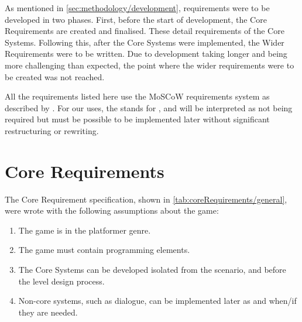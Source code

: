 
As mentioned in \autoref{sec:methodology/development}, requirements were to be developed in two phases. First, before the start of development, the Core Requirements are created and finalised. These detail requirements of the Core Systems. Following this, after the Core Systems were implemented, the Wider Requirements were to be written. Due to development taking longer and being more challenging than expected, the point where the wider requirements were to be created was not reached.

All the requirements listed here use the MoSCoW requirements system as described by \citet{useCaseModelling-MoSCoW}. For our uses, the  stands for , and will be interpreted as not being required but must be possible to be implemented later without significant restructuring or rewriting.

\section{Core Requirements}\label{sec:requirements/core}

The Core Requirement specification, shown in \autoref{tab:coreRequirements/general}, were wrote with the following assumptions about the game:

\begin{enumerate}
    \item The game is in the platformer genre.
    \item The game must contain programming elements.
    \item The Core Systems can be developed isolated from the scenario, and before the level design process.
    \item Non-core systems, such as dialogue, can be implemented later as and when/if they are needed.
\end{enumerate}

